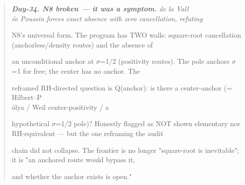 \documentclass[10pt]{article}
\begin{document}
\begin{quote}\itshape
\textbf{Day-34. N8 broken --- it was a symptom.} de la Vall\\\'ee Poussin forces exact absence with zero cancellation, refuting\par
N8's universal form. The program has TWO walls: square-root cancellation (anchorless/density routes) and the absence of\par
an unconditional anchor at \ensuremath{\sigma}=1/2 (positivity routes). The pole anchors \ensuremath{\sigma}=1 for free; the center has no anchor. The\par
reframed RH-directed question is Q(anchor): is there a center-anchor (= Hilbert--P\\\'olya / Weil center-positivity / a\par
hypothetical \ensuremath{\sigma}=1/2 pole)? Honestly flagged as NOT shown elementary nor RH-equivalent --- but the one reframing the audit\par
chain did not collapse. The frontier is no longer "square-root is inevitable"; it is "an anchored route would bypass it,\par
and whether the anchor exists is open."\par
\end{quote}
\end{document}
